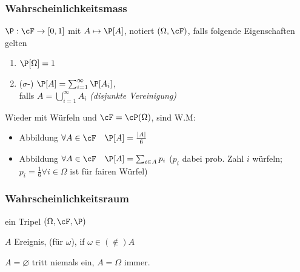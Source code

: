 \subsubsection{Wahrscheinlichkeitsmass}
\shortdefinition[W.M] $\P : \cF \rightarrow [0, 1]$ mit $A \mapsto \P[A]$, notiert $(\Omega, \cF)$, falls folgende Eigenschaften gelten
\begin{enumerate}[label=\textbf{E\arabic*.}]
    \item $\P[\Omega] = 1$
    \item ($\sigma$-) $\P[A] = \sum_{i = 1}^{\infty} \P[A_i]$,\\
          falls $A = \bigcup_{i = 1}^\infty A_i$ \textit{(disjunkte Vereinigung)}
\end{enumerate}
\shortexample Wieder mit Würfeln und $\cF = \cP(\Omega)$, sind W.M:
\begin{itemize}
    \item Abbildung $\forall A \in \cF \quad \P[A] = \frac{|A|}{6}$
    \item Abbildung $\forall A \in \cF \quad \P[A] = \sum_{i \in A} p_i$
          ($p_i$ dabei prob. Zahl $i$ würfeln; $p_i = \frac{1}{6} \forall i \in \Omega$ ist für fairen Würfel)
\end{itemize}


\newpage
\subsubsection{Wahrscheinlichkeitsraum}
\shortdefinition[W.R] ein Tripel $(\Omega, \cF, \P)$

\shortterm $A$ Ereignis,  (für $\omega$), if $\omega \in (\notin) A$

\shortremark $A = \varnothing$ tritt niemals ein, $A = \Omega$ immer.
